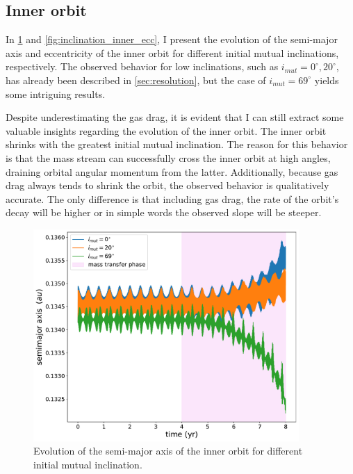 \subsection{Inner orbit}

In \cref{fig:inclination_inner_semimajor_axis} and \cref{fig:inclination_inner_ecc}, I present the evolution of the semi-major axis and eccentricity of the inner orbit for different initial mutual inclinations, respectively. The observed behavior for low inclinations, such as $i_{mut}=0^{\circ}, 20^{\circ}$, has already been described in \cref{sec:resolution}, but the case of $i_{mut}=69^{\circ}$ yields some intriguing results.

Despite underestimating the gas drag, it is evident that I can still extract some valuable insights regarding the evolution of the inner orbit. The inner orbit shrinks with the greatest initial mutual inclination. The reason for this behavior is that the mass stream can successfully cross the inner orbit at high angles, draining orbital angular momentum from the latter. Additionally, because gas drag always tends to shrink the orbit, the observed behavior is qualitatively accurate. The only difference is that including gas drag, the rate of the orbit's decay will be higher or in simple words the observed slope will be steeper. 
\begin{figure}[H]
    \centering
    \includegraphics[width=0.9\textwidth]{Thesis/graphs/inclination_case/inclination_inner_semimajor_axis.pdf}
    \caption{Evolution of the semi-major axis of the inner orbit for different initial mutual inclination.}
    \label{fig:inclination_inner_semimajor_axis}
\end{figure}
